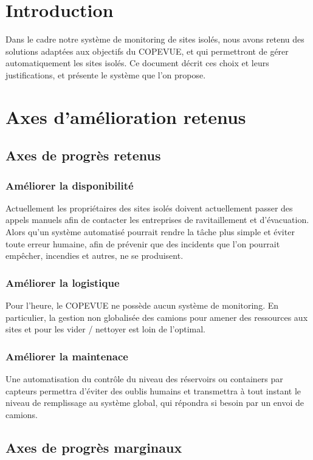 \section{Introduction}

Dans le cadre notre système de monitoring de sites isolés, nous avons retenu des solutions adaptées aux objectifs du COPEVUE, et qui permettront de gérer automatiquement les sites isolés. Ce document décrit ces choix et leurs justifications, et présente le système que l’on propose.

\section{Axes d’amélioration retenus}

\subsection{Axes de progrès retenus}

\subsubsection{Améliorer la disponibilité}
Actuellement les propriétaires des sites isolés doivent actuellement passer des appels manuels afin de contacter les entreprises de ravitaillement et d’évacuation. Alors qu’un système automatisé pourrait rendre la tâche plus simple et éviter toute erreur humaine, afin de prévenir que des incidents que l’on pourrait empêcher, incendies et autres, ne se produisent.

\subsubsection{Améliorer la logistique}
Pour l’heure, le COPEVUE ne possède aucun système de monitoring. En particulier, la gestion non globalisée des camions pour amener des ressources aux sites et pour les vider /  nettoyer est loin de l’optimal.


\subsubsection{Améliorer la maintenace}
Une automatisation du contrôle du niveau des réservoirs ou containers par capteurs permettra d’éviter des oublis humains et transmettra à tout instant le niveau de remplissage au système global, qui répondra si besoin par un envoi de camions.

\subsection{Axes de progrès marginaux}

